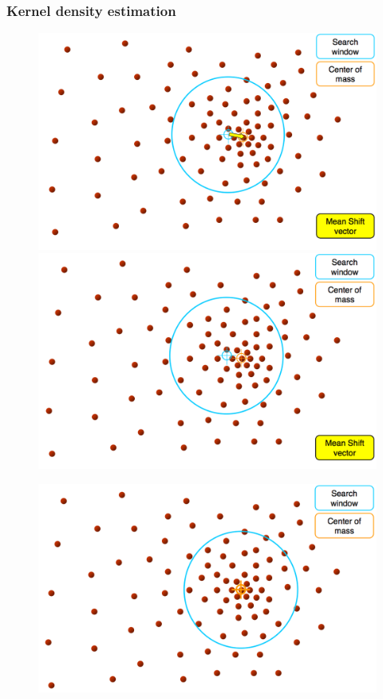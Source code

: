 \documentclass[notheorems,serif,table,compress]{beamer}  %
\begin{document}
\begin{frame}
\frametitle{Kernel density estimation}
    \begin{figure}
      \begin{minipage}[t]{0.45\linewidth}
      \includegraphics[width=1\linewidth]{meanshift5.png} 
      \end{minipage}
      \begin{minipage}[t]{0.45\linewidth}
      \includegraphics[width=1\linewidth]{meanshift6.png} 
      \end{minipage}
    \end{figure}
    \begin{figure}
      \includegraphics[width=0.45\linewidth]{meanshift7.png} 
    \end{figure}
\end{frame}
\end{document}
